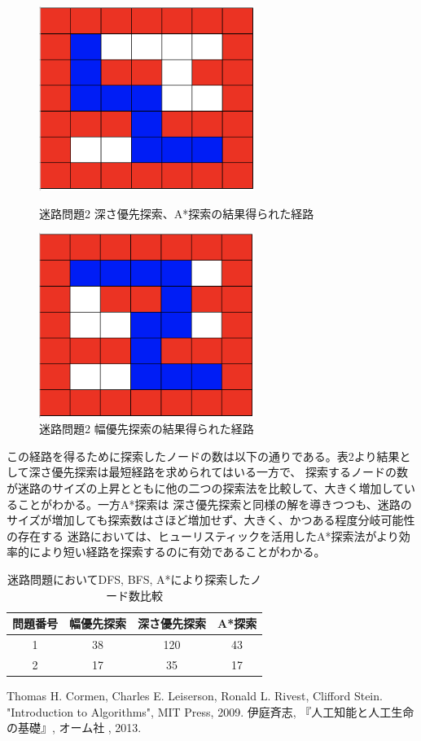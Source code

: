 \documentclass[uplatex]{jsarticle}
\begin{document}
\begin{figure}[htbp]
 \begin{minipage}{0.5\hsize}
  \begin{center}
   \includegraphics[width=70mm]{img/maze_2_dfs.png}
  \end{center}
  \caption{迷路問題2 深さ優先探索、A*探索の結果得られた経路}
  \label{fig:one}
 \end{minipage}
 \begin{minipage}{0.5\hsize}
  \begin{center}
   \includegraphics[width=70mm]{img/maze_2_bfs.png}
  \end{center}
  \caption{迷路問題2 幅優先探索の結果得られた経路}
  \label{fig:two}
 \end{minipage}
\end{figure}

この経路を得るために探索したノードの数は以下の通りである。表2より結果として深さ優先探索は最短経路を求められてはいる一方で、
探索するノードの数が迷路のサイズの上昇とともに他の二つの探索法を比較して、大きく増加していることがわかる。一方A*探索は
深さ優先探索と同様の解を導きつつも、迷路のサイズが増加しても探索数はさほど増加せず、大きく、かつある程度分岐可能性の存在する
迷路においては、ヒューリスティックを活用したA*探索法がより効率的により短い経路を探索するのに有効であることがわかる。

\begin{table}[htb]
  \begin{center}
    \caption{迷路問題においてDFS, BFS, A*により探索したノード数比較}
  \begin{tabular}{|c|c|c|c|} \hline
    問題番号 & 幅優先探索 & 深さ優先探索 & A*探索\\  \hline \hline
    1 & 38 & 120 & 43 \\
    2 & 17 & 35 & 17 \\
    \hline
  \end{tabular}
  \end{center}
\end{table}

\begin{thebibliography}{9}
   Thomas H. Cormen, Charles E. Leiserson, Ronald L. Rivest, Clifford Stein.
    "Introduction to Algorithms", MIT Press, 2009.
   伊庭斉志,
    『人工知能と人工生命の基礎』, オーム社 , 2013.
\end{thebibliography}
\end{document}
